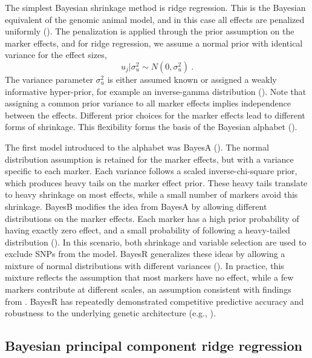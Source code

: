 
The simplest Bayesian shrinkage method is ridge regression. This is the Bayesian equivalent of the genomic animal model, and in this case all effects are penalized uniformly (\cite{gianola_priors_2013}). The penalization is applied through the prior assumption on the marker effects, and for ridge regression, we assume a normal prior with identical variance for the effect sizes, 
%
$$
u_j|\sigma_u^2 \sim N(0, \sigma_u^2) \ .
$$
%
The variance parameter $\sigma_u^2$ is either assumed known or assigned a weakly informative hyper-prior, for example an inverse-gamma distribution (\cite{aspheim_bayesian_2024}). Note that assigning a common prior variance to all marker effects implies independence between the effects. 
Different prior choices for the marker effects lead to different forms of shrinkage. This flexibility forms the basis of the Bayesian alphabet (\cite{gianola_priors_2013}).

The first model introduced to the alphabet was BayesA (\cite{meuwissen_prediction_2001}). The normal distribution assumption is retained for the marker effects, but with a variance specific to each marker. Each variance follows a scaled inverse-chi-square prior, which produces heavy tails on the marker effect prior. These heavy tails translate to heavy shrinkage on most effects, while a small number of markers avoid this shrinkage. 
%
BayesB modifies the idea from BayesA by allowing different distributions on the marker effects. Each marker has a high prior probability of having exactly zero effect, and a small probability of following a heavy-tailed distribution (\cite{meuwissen_prediction_2001}). In this scenario, both shrinkage and variable selection are used to exclude SNPs from the model. 
%
BayesR generalizes these ideas by allowing a mixture of normal distributions with different variances (\cite{gianola_priors_2013}). In practice, this mixture reflects the assumption that most markers have no effect, while a few markers contribute at different scales, an assumption consistent with findings from \textcite{aspheim_bayesian_2024}. BayesR has repeatedly demonstrated competitive predictive accuracy and robustness to the underlying genetic architecture (e.g., \cite{aspheim_bayesian_2024, ashraf_genomic_2022}).

\subsection{Bayesian principal component ridge regression}


